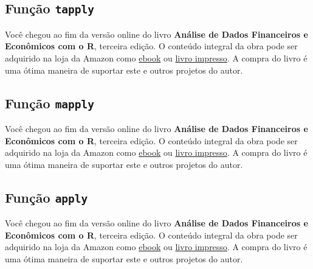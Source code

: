 \documentclass[
  11pt,
]{book}
\newenvironment{pleasebuyit}
{\begin{noteblock}
		
	} {\end{noteblock}}
\begin{document}
\hypertarget{funuxe7uxe3o-tapply}{%
\subsection{\texorpdfstring{Função \texttt{tapply}}{Função tapply}}\label{funuxe7uxe3o-tapply}}

\begin{pleasebuyit}
Você chegou ao fim da versão online do livro \textbf{Análise de Dados
Financeiros e Econômicos com o R}, terceira edição. O conteúdo integral
da obra pode ser adquirido na loja da Amazon como
\href{https://www.amazon.com.br/dp/B08WNC27ZY}{ebook} ou
\href{https://www.amazon.com/dp/B08WP8CCDB}{livro impresso}. A compra do
livro é uma ótima maneira de suportar este e outros projetos do autor.
\end{pleasebuyit}

\hypertarget{funuxe7uxe3o-mapply}{%
\subsection{\texorpdfstring{Função \texttt{mapply}}{Função mapply}}\label{funuxe7uxe3o-mapply}}

\begin{pleasebuyit}
Você chegou ao fim da versão online do livro \textbf{Análise de Dados
Financeiros e Econômicos com o R}, terceira edição. O conteúdo integral
da obra pode ser adquirido na loja da Amazon como
\href{https://www.amazon.com.br/dp/B08WNC27ZY}{ebook} ou
\href{https://www.amazon.com/dp/B08WP8CCDB}{livro impresso}. A compra do
livro é uma ótima maneira de suportar este e outros projetos do autor.
\end{pleasebuyit}

\hypertarget{funuxe7uxe3o-apply}{%
\subsection{\texorpdfstring{Função \texttt{apply}}{Função apply}}\label{funuxe7uxe3o-apply}}

\begin{pleasebuyit}
Você chegou ao fim da versão online do livro \textbf{Análise de Dados
Financeiros e Econômicos com o R}, terceira edição. O conteúdo integral
da obra pode ser adquirido na loja da Amazon como
\href{https://www.amazon.com.br/dp/B08WNC27ZY}{ebook} ou
\href{https://www.amazon.com/dp/B08WP8CCDB}{livro impresso}. A compra do
livro é uma ótima maneira de suportar este e outros projetos do autor.
\end{pleasebuyit}
\end{document}
